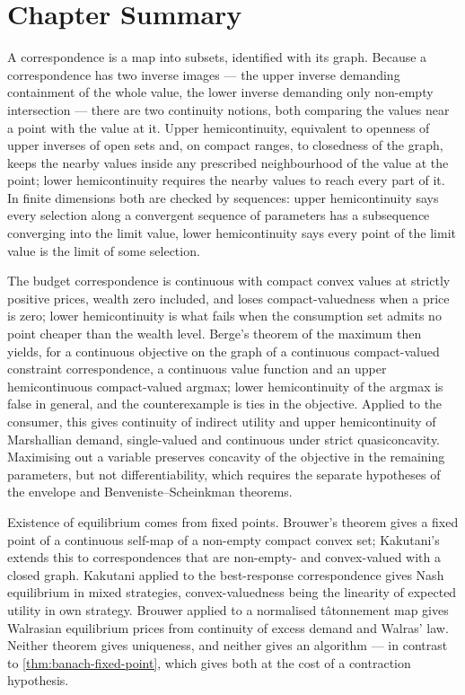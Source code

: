 \section{Chapter Summary}\label{sec:corr-summary}

A correspondence is a map into subsets, identified with its graph. Because a
correspondence has two inverse images --- the upper inverse demanding containment
of the whole value, the lower inverse demanding only non-empty intersection ---
there are two continuity notions, both comparing the values near a point with the
value at it. Upper hemicontinuity, equivalent to openness of upper inverses of
open sets and, on compact ranges, to closedness of the graph, keeps the nearby
values inside any prescribed neighbourhood of the value at the point; lower
hemicontinuity requires the nearby values to reach every part of it. In finite
dimensions both are checked by sequences: upper hemicontinuity says every
selection along a convergent sequence of parameters has a subsequence converging
into the limit value, lower hemicontinuity says every point of the limit value is
the limit of some selection.

The budget correspondence is continuous with compact convex values at strictly
positive prices, wealth zero included, and loses compact-valuedness when a price
is zero; lower hemicontinuity is what fails when the consumption set admits no
point cheaper than the wealth level.
Berge's theorem of the maximum then yields, for a continuous objective on the
graph of a continuous compact-valued constraint correspondence, a continuous
value function and an upper hemicontinuous compact-valued argmax; lower
hemicontinuity of the argmax is false in general, and the counterexample is
ties in the objective. Applied to the consumer, this gives continuity of indirect
utility and upper hemicontinuity of Marshallian demand, single-valued and
continuous under strict quasiconcavity. Maximising out a variable preserves
concavity of the objective in the remaining parameters, but not
differentiability, which requires the separate hypotheses of the envelope and
Benveniste--Scheinkman theorems.

Existence of equilibrium comes from fixed points. Brouwer's theorem gives a fixed
point of a continuous self-map of a non-empty compact convex set; Kakutani's
extends this to correspondences that are non-empty- and convex-valued with a
closed graph. Kakutani applied to the best-response correspondence gives Nash
equilibrium in mixed strategies, convex-valuedness being the linearity of
expected utility in own strategy. Brouwer applied to a normalised t\^atonnement
map gives Walrasian equilibrium prices from continuity of excess demand and
Walras' law. Neither theorem gives uniqueness, and neither gives an algorithm ---
in contrast to \autoref{thm:banach-fixed-point}, which gives both at the cost of
a contraction hypothesis.

